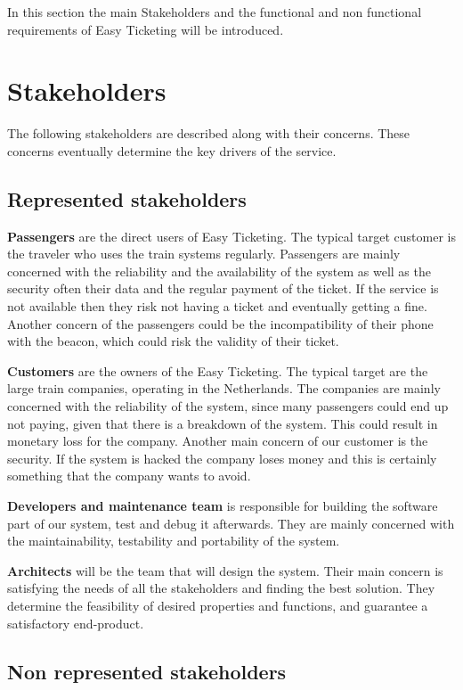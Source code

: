 
In this section the main Stakeholders and the functional and non functional requirements of Easy Ticketing will be introduced.

\section{Stakeholders}
The following stakeholders are described along with their concerns. These concerns eventually determine the key drivers of the service.

\subsection{Represented stakeholders}


\textbf{Passengers}  are the direct users of Easy Ticketing. The typical target customer is the traveler who uses the train systems regularly. Passengers are mainly concerned with the reliability and the availability of the system as well as the security often their data and the regular payment of the ticket. If the service is not available then they risk not having a ticket and eventually getting a fine.  Another concern of the passengers could be the incompatibility of their phone with the beacon, which could risk the validity of their ticket.

\textbf{Customers} are the owners of the Easy Ticketing. The typical target are the large train companies, operating in the Netherlands. The companies are mainly concerned with the reliability of the system, since many passengers could end up not paying, given that there is a breakdown of the system. This could result in monetary loss for the company. Another main concern of our customer is the security. If the system is hacked the  company loses money and this is certainly something that the company wants to avoid.

\textbf{Developers and maintenance team} is responsible for building the software part of our system, test and debug it afterwards. They are mainly concerned with the maintainability, testability and portability of the system.

\textbf{Architects} will be the team that will design the system. Their main concern is satisfying the needs of all the stakeholders and finding the best solution. They determine the feasibility of desired properties and functions, and guarantee a satisfactory end-product.


\subsection{Non represented stakeholders}


